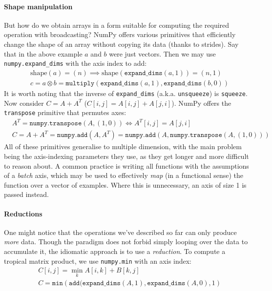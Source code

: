 \paragraph{Shape manipulation} But how do we obtain arrays in a form suitable for computing the required operation with broadcasting? NumPy offers various primitives that efficiently change the shape of an array without copying its data (thanks to strides). Say that in the above example $a$ and $b$ were just vectors. Then we may use \texttt{numpy.expand\_dims} with the axis index to add:
\begin{align*}
&\mathrm{shape}(a) = (n) \implies \mathrm{shape}(\texttt{expand\_dims}(a, 1)) = (n, 1) \\
&c = a \otimes b = \texttt{multiply} \left( \texttt{expand\_dims}(a, 1), \texttt{expand\_dims}(b, 0) \right)
\end{align*}
It is worth noting that the inverse of \texttt{expand\_dims} (a.k.a. \texttt{unsqueeze}) is \texttt{squeeze}. Now consider $C = A + A^T$ ($C[i, j] = A[i, j] + A[j, i]$). NumPy offers the \texttt{transpose} primitive that permutes axes:
\begin{align*}
&A^T = \texttt{numpy.transpose}(A, (1, 0)) \iff A^T[i, j] = A[j, i] \\
&C = A + A^T = \texttt{numpy.add}(A, A^T) = \texttt{numpy.add}(A, \texttt{numpy.transpose}(A, (1, 0))) 
\end{align*}
All of these primitives generalise to multiple dimension, with the main problem being the axis-indexing parameters they use, as they get longer and more difficult to reason about. A common practice is writing all functions with the assumptions of a \textit{batch} axis, which may be used to effectively \textit{map} (in a functional sense) the function over a vector of examples. Where this is unnecessary, an axis of size 1 is passed instead.

\paragraph{Reductions}

One might notice that the operations we've described so far can only produce \textit{more} data. Though the paradigm does not forbid simply looping over the data to accumulate it, the idiomatic approach is to use a \textit{reduction}. To compute a tropical matrix product, we use \texttt{numpy.min} with an axis index:
\begin{align*}
&C[i, j] = \min_k A[i, k] + B[k, j] \\
&C = \texttt{min} \left( \texttt{add}(\texttt{expand\_dims}(A, 1), \texttt{expand\_dims}(A, 0), 1 \right)
\end{align*}

